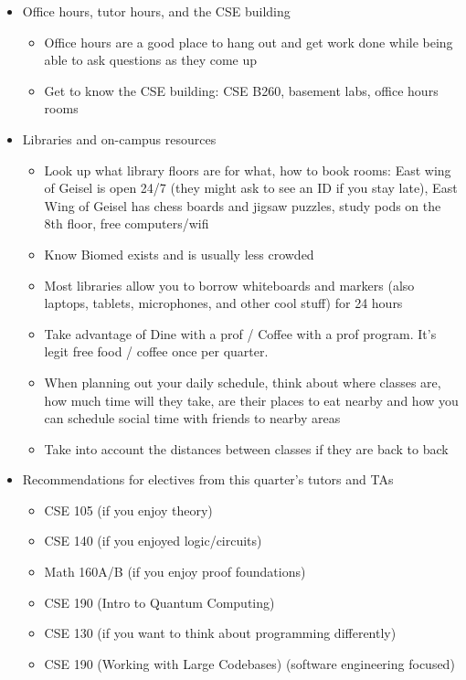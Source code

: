 \documentclass[12pt, oneside]{article}
\begin{document}
\begin{itemize}
\item Office hours, tutor hours, and the CSE building
\begin{itemize}
\item Office hours are a good place to hang out and get work done while being able to ask questions as they come up 
\item Get to know the CSE building: CSE B260, basement labs, office hours rooms
\end{itemize}
\item Libraries and on-campus resources
\begin{itemize}
\item Look up what library floors are for what, how to book rooms: East wing of Geisel is open 24/7 (they might ask to see an ID if you stay late), East Wing of Geisel has chess boards and jigsaw puzzles, study pods on the 8th floor, 
free computers/wifi
\item Know Biomed exists and is usually less crowded
\item Most libraries allow you to borrow whiteboards and markers (also laptops, tablets, microphones, and other cool stuff) for 24 hours
\item Take advantage of Dine with a prof / Coffee with a prof program. It's legit free food / coffee once per quarter. 
\item When planning out your daily schedule, think about where classes are, how much time will they take, are their places to eat nearby and how you can schedule social time with friends to nearby areas 
\item Take into account the distances between classes if they are back to back
\end{itemize} 
\item Recommendations for electives from this quarter's tutors and TAs
\begin{itemize}
\item CSE 105 (if you enjoy theory)
\item CSE 140 (if you enjoyed logic/circuits)
\item Math 160A/B (if you enjoy proof foundations)
\item CSE 190 (Intro to Quantum Computing)
\item CSE 130 (if you want to think about programming differently)
\item CSE 190 (Working with Large Codebases) (software engineering focused)
\end{itemize}
\end{itemize}
\end{document}

